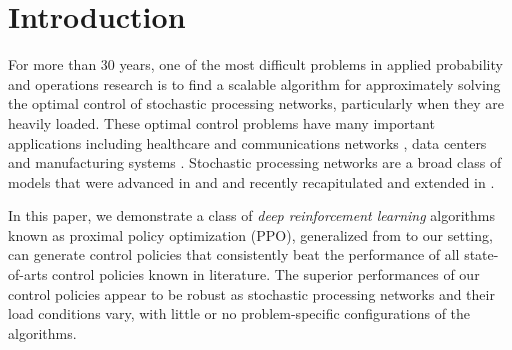\documentclass[11pt]{article}
\theoremstyle{definition}
\numberwithin{equation}{section}
\begin{document}
\section{Introduction}

For more than 30 years, one of the most difficult problems in applied
probability and operations research is to find a scalable algorithm
for approximately solving the optimal control of stochastic processing
networks, particularly when they are heavily loaded. These optimal
control problems have many important applications including healthcare
\cite{DaiShi2019} and communications networks \cite{SrikYing2014, Luong2019},
data centers \cite{MMAW1999,MaguSrikYing2012} and manufacturing systems
\cite{PerkKuma1989, Kuma1993}. Stochastic processing networks are a broad class of
models that were advanced in \cite{Harr2000} and \cite{Harr2002} and
recently recapitulated and extended in \cite{DaiHarr2020}.

In this paper, we demonstrate a class of \emph{deep reinforcement
  learning} algorithms known as proximal policy optimization (PPO),
 generalized from \cite{Schulman2015, Schulman2017} to our
  setting, can generate control policies that consistently beat the
performance of all state-of-arts control policies known in
literature. The superior performances of our control policies appear
to be robust as stochastic processing networks and their load
conditions vary, with little or no problem-specific configurations of
the algorithms.
\end{document}
